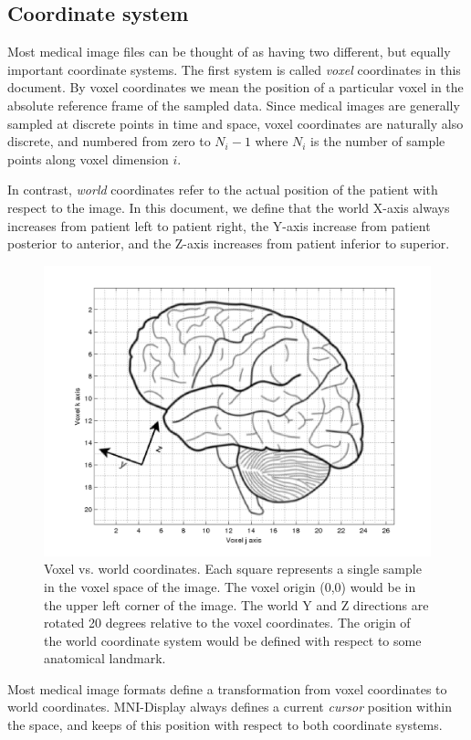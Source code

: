 \documentclass[11pt,letterpaper]{article}
\newcommand{\display}{\mbox{MNI-Display}}
\begin{document}
\subsection{Coordinate system}

Most medical image files can be thought of as having two different,
but equally important coordinate systems. The first system is called
{\em voxel} coordinates in this document. By voxel coordinates we mean
the position of a particular voxel in the absolute reference frame of
the sampled data. Since medical images are generally sampled at
discrete points in time and space, voxel coordinates are naturally
also discrete, and numbered from zero to $N_i-1$ where $N_i$ is the
number of sample points along voxel dimension $i$.

In contrast, {\em world} coordinates refer to the actual position of
the patient with respect to the image. In this document, we define
that the world X-axis always increases from patient left to patient
right, the Y-axis increase from patient posterior to anterior, and the
Z-axis increases from patient inferior to superior.

\begin{figure}
\centering
\includegraphics[width=0.75\linewidth]{coordinates.png}
\caption[Voxel vs. world coordinates]{Voxel vs. world coordinates. Each square represents a single sample in the voxel space of the image. The voxel origin (0,0) would be in the upper left corner of the image. The world Y and Z directions
are rotated 20 degrees relative to the voxel coordinates. The origin of the world coordinate system would be defined with respect to some anatomical landmark.}
\label{figCoord}
\end{figure}
Most medical image formats define a transformation from voxel
coordinates to world coordinates. \display{} always defines a current
{\em cursor} position within the space, and keeps of this position
with respect to both coordinate systems.
\end{document}
